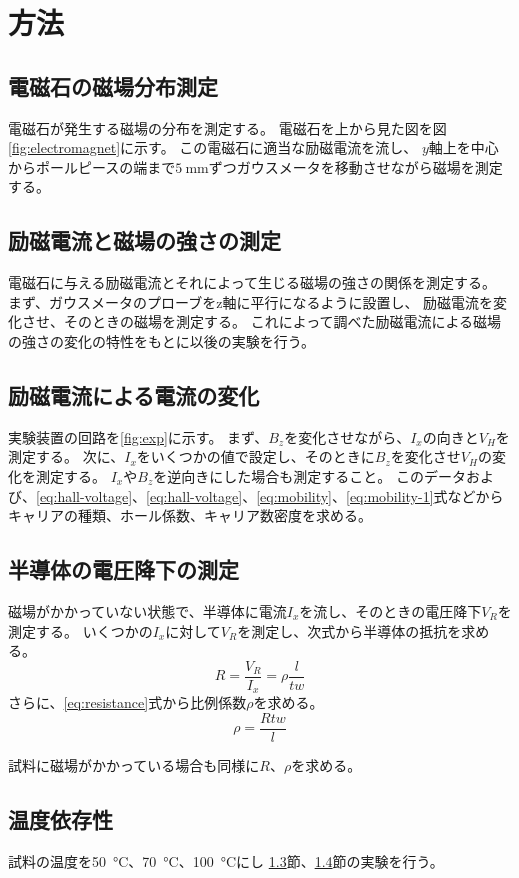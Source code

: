 \documentclass[../../../main]{subfiles}
\begin{document}
\section{方法}

\subsection{電磁石の磁場分布測定}
電磁石が発生する磁場の分布を測定する。
電磁石を上から見た図を図\ref{fig:electromagnet}に示す。
この電磁石に適当な励磁電流を流し、
$y$軸上を中心からポールピースの端まで$\SI{5}{\milli\meter}$ずつガウスメータを移動させながら磁場を測定する。


\subsection{励磁電流と磁場の強さの測定}
電磁石に与える励磁電流とそれによって生じる磁場の強さの関係を測定する。
まず、ガウスメータのプローブをz軸に平行になるように設置し、
励磁電流を変化させ、そのときの磁場を測定する。
これによって調べた励磁電流による磁場の強さの変化の特性をもとに以後の実験を行う。

\subsection{励磁電流による電流の変化}\label{subsec:current}
実験装置の回路を\ref{fig:exp}に示す。
まず、$B_z$を変化させながら、$I_x$の向きと$V_H$を測定する。
次に、$I_x$をいくつかの値で設定し、そのときに$B_z$を変化させ$V_H$の変化を測定する。
$I_x$や$B_z$を逆向きにした場合も測定すること。
このデータおよび、\ref{eq:hall-voltage}、\ref{eq:hall-voltage}、\ref{eq:mobility}、\ref{eq:mobility-1}式などから
キャリアの種類、ホール係数、キャリア数密度を求める。

\subsection{半導体の電圧降下の測定}\label{subsec:resistance}
磁場がかかっていない状態で、半導体に電流$I_x$を流し、そのときの電圧降下$V_R$を測定する。
いくつかの$I_x$に対して$V_R$を測定し、次式から半導体の抵抗を求める。
\begin{equation}\label{eq:resistance}
	R = \frac{V_R}{I_x} = \rho \dfrac{l}{tw}
\end{equation}
さらに、\ref{eq:resistance}式から比例係数$\rho$を求める。
\begin{equation}\label{eq:resistance-coefficient}
	\rho = \dfrac{Rtw}{l}
\end{equation}

試料に磁場がかかっている場合も同様に$R$、$\rho$を求める。

\subsection{温度依存性}
試料の温度を\SI{50}{\celsius}、\SI{70}{\celsius}、\SI{100}{\celsius}にし
\ref{subsec:current}節、\ref{subsec:resistance}節の実験を行う。





\end{document}
